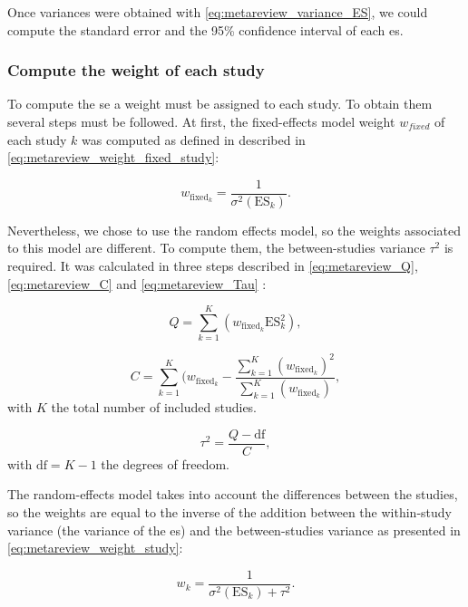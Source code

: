 Once variances were obtained with \cref{eq:metareview_variance_ES}, we could compute the standard error and the 95\% confidence interval of each \gls{es}. 

\subsubsection{Compute the weight of each study}

To compute the \gls{se} a weight must be assigned to each study. To obtain them several steps must be followed. At first, the fixed-effects model 
weight $w_{fixed}$ of each study $k$ was computed as defined in \citet{Borenstein2009} described in \cref{eq:metareview_weight_fixed_study}: 

\begin{equation}
\label{eq:metareview_weight_fixed_study}
w_{\text{fixed}_k} = \frac{1}{\sigma^2(\text{ES}_k)}.
\end{equation} 

Nevertheless, we chose to use the random effects model, so the weights associated to this model are different. To compute them, the between-studies 
variance $\tau^2$ is required. It was calculated in three steps described in \cref{eq:metareview_Q}, \cref{eq:metareview_C} and \cref{eq:metareview_Tau} 
\citep{Borenstein2009}:

\begin{equation}
\label{eq:metareview_Q}
Q = \sum_{k=1}^{K} (w_{\text{fixed}_k} \text{ES}_k^2),
\end{equation}

\begin{equation}
\label{eq:metareview_C}
C = \sum_{k=1}^{K} (w_{\text{fixed}_k} - \frac{ \sum_{k=1}^{K} (w_{\text{fixed}_k})^2 } { \sum_{k=1}^{K} (w_{\text{fixed}_k}) },
\end{equation}
with $K$ the total number of included studies.

\begin{equation}
\label{eq:metareview_Tau}
\tau^2 = \frac{Q - \text{df}}{C},
\end{equation}
with $\text{df} = K - 1$ the degrees of freedom.

The random-effects model takes into account the differences between the studies, so the weights are equal to the inverse of the addition between the 
within-study variance (the variance of the \gls{es}) and the between-studies variance as presented in \cref{eq:metareview_weight_study}:

\begin{equation}
\label{eq:metareview_weight_study}
w_k = \frac{1}{\sigma^2(\text{ES}_k) + \tau^2}.
\end{equation} 


